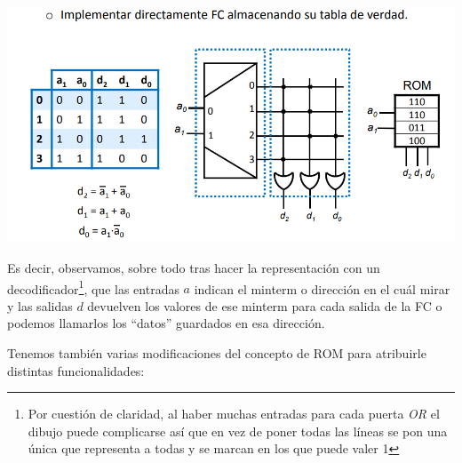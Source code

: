 \documentclass[a4paper,10pt]{book}
\begin{document}
\begin{center}
\includegraphics[scale=0.65]{ROM 3}
\end{center}

Es decir, observamos, sobre todo tras hacer la representación con un decodificador\footnote{Por cuestión de claridad, al haber muchas entradas para cada puerta \textit{OR} el dibujo puede complicarse así que en vez de poner todas las líneas se pon una única que representa a todas y se marcan en los que puede valer 1}, que las entradas $a$ indican el minterm o dirección en el cuál mirar y las salidas $d$ devuelven los valores de ese minterm para cada salida de la FC o podemos llamarlos los ``datos'' guardados en esa dirección.

Tenemos también varias modificaciones del concepto de ROM para atribuirle distintas funcionalidades:
\end{document}
